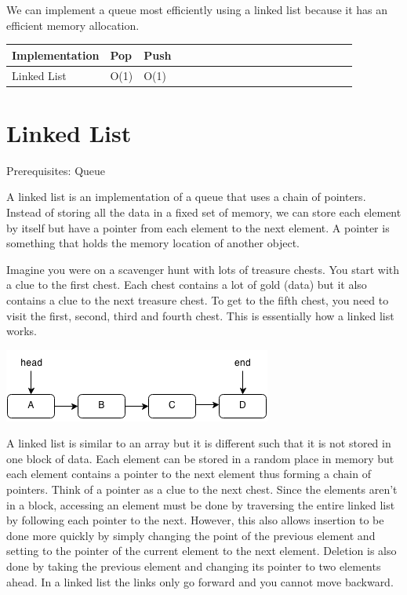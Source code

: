 \documentclass[11pt,oneside]{book}
\makeatletter
\def\maxwidth#1{\ifdim\Gin@nat@width>#1 #1\else\Gin@nat@width\fi}
\makeatother
\begin{document}
        

We can implement a queue most efficiently using a linked list because it has an efficient memory allocation.

\vspace{10px}\begin{tabulary}{0.4\linewidth}{|l|l|l|l|l|l|l|l|l|l|l|l|l|l|l|l|l|l|l}\hline


  Implementation &
  Pop &
  Push\\
\hline


  Linked List &
  O(1) &
  O(1)\\

\hline\end{tabulary}


        \section{ Linked List }
        

Prerequisites: Queue



A linked list is an implementation of a queue that uses a chain of pointers. Instead of storing all the data in a fixed set of memory, we can store each element by itself but have a pointer from each element to the next element. A pointer is something that holds the memory location of another object.

Imagine you were on a scavenger hunt with lots of treasure chests. You start with a clue to the first chest. Each chest contains a lot of gold (data) but it also contains a clue to the next treasure chest. To get to the fifth chest, you need to visit the first, second, third and fourth chest. This is essentially how a linked list works.

\vspace{5px}\includegraphics[width=\maxwidth{\textwidth}]{linkedlist.png}

A linked list is similar to an array but it is different such that it is not stored in one block of data. Each element can be stored in a random place in memory but each element contains a pointer to the next element thus forming a chain of pointers. Think of a pointer as a clue to the next chest. Since the elements aren't in a block, accessing an element must be done by traversing the entire linked list by following each pointer to the next. However, this also allows insertion to be done more quickly by simply changing the point of the previous element and setting to the pointer of the current element to the next element. Deletion is also done by taking the previous element and changing its pointer to two elements ahead. In a linked list the links only go forward and you cannot move backward.
\end{document}
